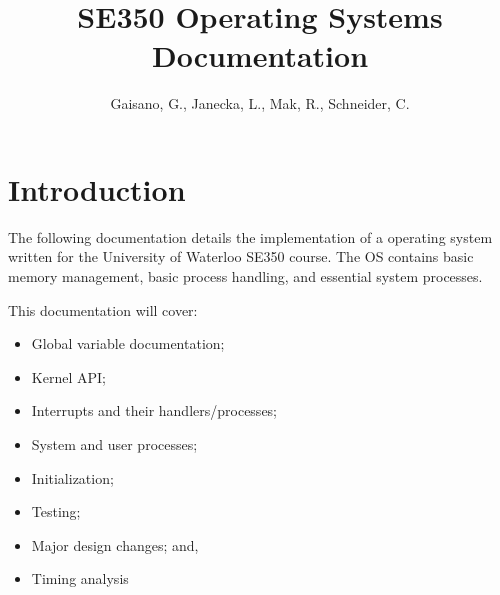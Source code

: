 \documentclass[11pt, oneside]{article}
\title{SE350 Operating Systems Documentation}
\author{Gaisano, G., Janecka, L., Mak, R., Schneider, C.}
\begin{document}
\maketitle

\section{Introduction}
The following documentation details the implementation of a operating system written for the University of Waterloo SE350 course. The OS contains basic memory management, basic process handling, and essential system processes.

This documentation will cover:
\begin{itemize}
\item Global variable documentation;
\item Kernel API;
\item Interrupts and their handlers/processes;
\item System and user processes;
\item Initialization;
\item Testing;
\item Major design changes; and,
\item Timing analysis
\end{itemize}
\end{document}
